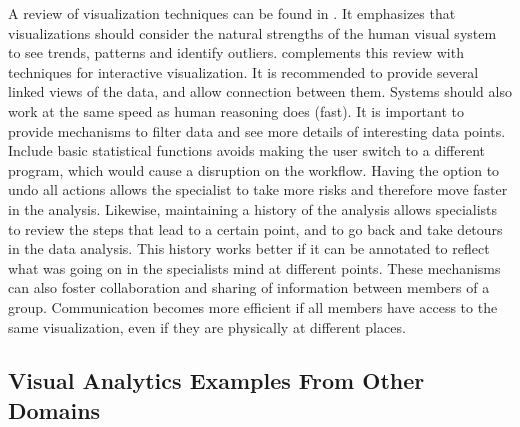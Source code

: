 A review of visualization techniques can be found in \autocite{heer_tour_2010}. It emphasizes that visualizations should consider the natural strengths of the human visual system to see trends, patterns and identify outliers. \autocite{heer_interactive_2012} complements this review with techniques for interactive visualization. It is recommended to provide several linked views of the data, and allow connection between them. Systems should also work at the same speed as human reasoning does (fast). It is important to provide mechanisms to filter data and see more details of interesting data points. Include basic statistical functions avoids making the user switch to a different program, which would cause a disruption on the workflow. Having the option to undo all actions allows the specialist to take more risks and therefore move faster in the analysis. Likewise, maintaining a history of the analysis allows specialists to review the steps that lead to a certain point, and to go back and take detours in the data analysis. This history works better if it can be annotated to reflect what was going on in the specialists mind at different points. These mechanisms can also foster collaboration and sharing of information between members of a group. Communication becomes more efficient if all members have access to the same visualization, even if they are physically at different places.







\subsection{Visual Analytics Examples From Other Domains}


